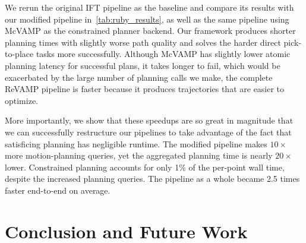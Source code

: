 \documentclass[letterpaper, 10 pt, conference]{ieeeconf}
\begin{document}
We rerun the original IFT pipeline as the baseline and compare its results with our modified pipeline in~\cref{tab:ruby_results}, as well as the same pipeline using McVAMP as the constrained planner backend. Our framework produces shorter planning times with slightly worse path quality and solves the harder direct pick-to-place tasks more successfully. Although McVAMP has slightly lower atomic planning latency for successful plans, it takes longer to fail, which would be exacerbated by the large number of planning calls we make, the complete ReVAMP pipeline is faster because it produces trajectories that are easier to optimize.

More importantly, we show that these speedups are so great in magnitude that we can successfully restructure our pipelines to take advantage of the fact that satisficing planning has negligible runtime. The modified pipeline makes $10\times$ more motion-planning queries, yet the aggregated planning time is nearly $20\times$ lower. 
Constrained planning accounts for only 1\% of the per-point wall time, despite the increased planning queries. The pipeline as a whole became 2.5 times faster end-to-end on average.




\section{Conclusion and Future Work}
\end{document}
